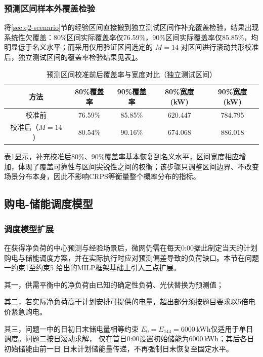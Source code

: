 \subsubsection{预测区间样本外覆盖检验}
\label{sec:q2-calibration}
将\ref{sec:q2-scenario}节的经验区间直接搬到独立测试区间作补充覆盖检验，结果出现系统性欠覆盖：80\%区间实际覆盖率仅76.59\%，90\%区间实际覆盖率仅85.85\%，均明显低于名义水平；而采用仅用验证区间选定的 $M=14$ 对区间进行滚动共形校准\cite{ref_conformal}后，独立测试区间的覆盖率检验结果见表\ref{tab:q2-coverage}。

\begin{table}[H]
  \centering
  \caption{预测区间校准前后覆盖率与宽度对比（独立测试区间）}
  \label{tab:q2-coverage}
  \footnotesize
  \setlength{\tabcolsep}{4pt}
  \renewcommand{\arraystretch}{1.3}
  \begin{tabular}{|c|c|c|c|c|}
    \hline
    方法 & 80\%覆盖率 & 90\%覆盖率 & 80\%宽度(kW) & 90\%宽度(kW) \\
    \hline
    校准前 & 76.59\% & 85.85\% & 620.447 & 784.795 \\
    \hline
    校准后（$M=14$） & 80.54\% & 90.16\% & 674.068 & 886.018 \\
    \hline
  \end{tabular}
\end{table}

表\ref{tab:q2-coverage}显示，补充校准后80\%、90\%覆盖率基本恢复到名义水平，区间宽度相应增加，体现了覆盖可靠性与区间尖锐性之间的权衡；该步骤只调整区间边界、不改变场景分布本身，因此不影响CRPS等衡量整个概率分布的指标。

\subsection{购电-储能调度模型}
\subsubsection{调度模型扩展}
在获得净负荷的中心预测与经验场景后，微网仍需在每天0:00据此制定当天的计划购电与储能调度方案，并在实际执行时应对预测偏差导致的负荷缺口。本节在问题一约束1至约束5 给出的MILP框架基础上引入三点扩展。

其一，供需平衡中的净负荷由已知的确定性负荷、光伏替换为预测值；

其二，若实际净负荷高于计划安排可提供的电量，超出部分须按题目要求以5倍电价紧急购电。

其三，问题一中的日初日末储电量相等约束
$E_0=E_{144}=6000$\,kWh仅适用于单日调度。问题二按日滚动求解，
仅在首日0:00设置初始储能为6000\,kWh；其后各日初始储能由前一日
日末计划储能量传递，不再强制日末恢复至固定水平。

